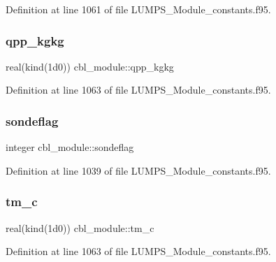 Definition at line 1061 of file L\+U\+M\+P\+S\+\_\+\+Module\+\_\+constants.\+f95.

\mbox{\label{namespacecbl__module_a9698f773fdba998c463aa4dad50675a6}} 
\subsubsection{\texorpdfstring{qpp\+\_\+kgkg}{qpp\_kgkg}}
{\footnotesize\ttfamily real(kind(1d0)) cbl\+\_\+module\+::qpp\+\_\+kgkg}



Definition at line 1063 of file L\+U\+M\+P\+S\+\_\+\+Module\+\_\+constants.\+f95.

\mbox{\label{namespacecbl__module_a546f4ac8b1d6305356caf940d8e8e342}} 
\subsubsection{\texorpdfstring{sondeflag}{sondeflag}}
{\footnotesize\ttfamily integer cbl\+\_\+module\+::sondeflag}



Definition at line 1039 of file L\+U\+M\+P\+S\+\_\+\+Module\+\_\+constants.\+f95.

\mbox{\label{namespacecbl__module_a9981080497583b5953927b0a2bbdcde8}} 
\subsubsection{\texorpdfstring{tm\+\_\+c}{tm\_c}}
{\footnotesize\ttfamily real(kind(1d0)) cbl\+\_\+module\+::tm\+\_\+c}



Definition at line 1063 of file L\+U\+M\+P\+S\+\_\+\+Module\+\_\+constants.\+f95.

\mbox{\label{namespacecbl__module_afb21accdfbc0b24e12b24a44ffd9d6d1}} 
